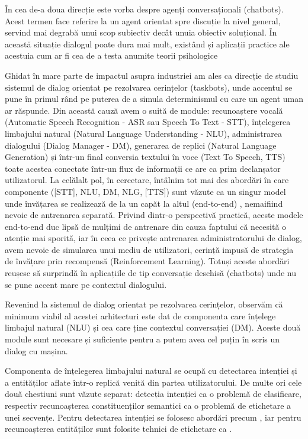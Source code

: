 În cea de-a doua direcție este vorba despre agenți conversaționali (chatbots). Acest termen face referire la un agent orientat spre discuție la nivel general, servind mai degrabă unui scop subiectiv decât unuia obiectiv soluțional. În această situație dialogul poate dura mai mult, existând și aplicații practice ale acestuia cum ar fi cea de a testa anumite teorii psihologice \cite{weizenbaum}

Ghidat în mare parte de impactul asupra industriei am ales ca direcție de studiu sistemul de dialog orientat pe rezolvarea cerințelor (taskbots), unde accentul se pune în primul rând pe puterea de a simula determinismul cu care un agent uman ar răspunde. Din această cauză avem o suită de module: recunoaștere vocală (Automatic Speech Recognition - ASR sau Speech To Text - STT), înțelegerea limbajului natural (Natural Language Understanding - NLU), administrarea dialogului (Dialog Manager - DM), generarea de replici (Natural Language Generation) și într-un final conversia textului în voce (Text To Speech, TTS) toate acestea conectate într-un flux de informații ce are ca prim declanșator utilizatorul. La celălalt pol, în cercetare, întâlnim tot mai des abordări în care componente ([STT], NLU, DM, NLG, [TTS]) sunt văzute ca un singur model unde învățarea se realizează de la un capăt la altul (end-to-end) \cite{e2e-1, e2e-2, e2e-3, kv-manning}, nemaifiind nevoie de antrenarea separată. Privind dintr-o perspectivă practică, aceste modele end-to-end duc lipsă de mulțimi de antrenare din cauza faptului că necesită o atenție mai sporită, iar în ceea ce privește antrenarea administratorului de dialog, avem nevoie de simularea unui mediu de utilizatori, cerință impusă de strategia de învățare prin recompensă (Reinforcement Learning). Totuși aceste abordări reușesc să surprindă în aplicațiile de tip conversație deschisă (chatbots) unde nu se pune accent mare pe contextul dialogului.

Revenind la sistemul de dialog orientat pe rezolvarea cerințelor, observăm că minimum viabil al acestei arhitecturi este dat de componenta care înțelege limbajul natural (NLU) și cea care ține contextul conversației (DM). Aceste două module sunt necesare și suficiente pentru a putem avea cel puțin în scris un dialog cu mașina. 

Componenta de înțelegerea limbajului natural se ocupă cu detectarea intenției și a entităților aflate într-o replică venită din partea utilizatorului. De multe ori cele două chestiuni sunt văzute separat: detecția intenției ca o problemă de clasificare, respectiv recunoașterea constituenților semantici ca o problemă de etichetare a unei secvențe.
Pentru detectarea intenției se folosesc abordări precum \cite{recursive-nn-intent, boosting-intent, boostingplus-intent, att_joint_bing}, iar pentru recunoașterea entităților sunt folosite tehnici de etichetare ca \cite{sarika-cnn-crf, rnn-label-samp, deep-lstm, rnn-em, ecn-deep-lstm, att_joint_bing, mesnil-rnn-crf}.

